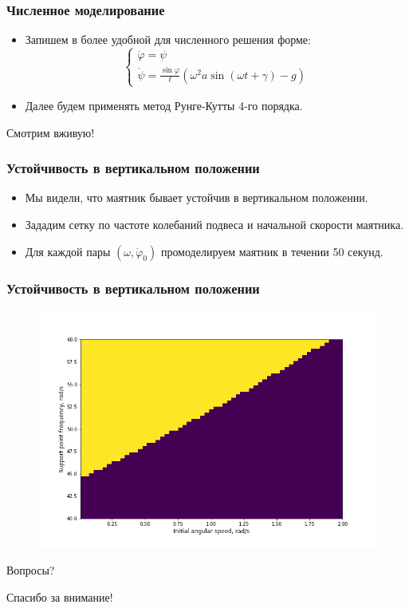 \documentclass[14pt]{beamer}
\begin{document}
\begin{frame}
\frametitle{Численное моделирование}
\begin{itemize}[<+->]
\item Запишем в более удобной для численного решения форме:
\[
\begin{cases}
\dot{\varphi} = \psi \\
\dot{\psi} = \frac{\sin\varphi}{\ell}(\omega^2a\sin(\omega t + \gamma) - g) 
\end{cases}
\]
\item Далее будем применять метод Рунге-Кутты 4-го порядка.
\end{itemize}
\end{frame}

\begin{frame}
\begin{center}
\LARGE{Смотрим вживую!}
\end{center}
\end{frame}

\begin{frame}
\frametitle{Устойчивость в вертикальном положении}
\begin{itemize}[<+->]
\item Мы видели, что маятник бывает устойчив в вертикальном положении.
\item Зададим сетку по частоте колебаний подвеса и начальной скорости маятника.
\item Для каждой пары $(\omega, \dot{\varphi}_0)$ промоделируем маятник в течении 50 секунд.
\end{itemize}
\end{frame}

\begin{frame}
\frametitle{Устойчивость в вертикальном положении}
\begin{figure}
\includegraphics[width=0.9\linewidth]{stabilization.png}
\end{figure}
\end{frame}

\begin{frame}
\begin{center}
\LARGE{Вопросы?}
\end{center}
\end{frame}

\begin{frame}
\begin{center}
\LARGE{Спасибо за внимание!}
\end{center}
\end{frame}
\end{document}
